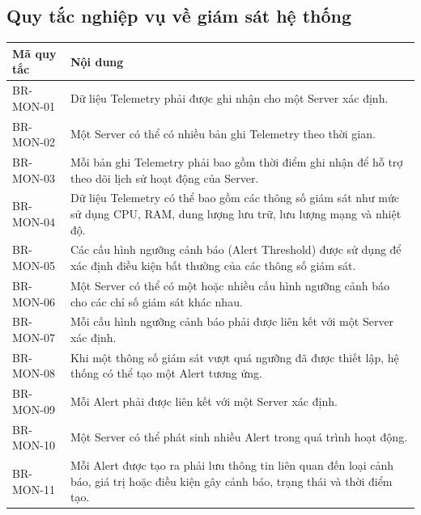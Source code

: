 \subsection{Quy tắc nghiệp vụ về giám sát hệ thống}
\begin{center}
\begin{longtable}{|>{\raggedright\arraybackslash}p{3.5cm}|>{\raggedright\arraybackslash}p{11.0cm}|}
\hline
\textbf{Mã quy tắc} & \textbf{Nội dung} \\ \hline
\endhead
BR-MON-01 & Dữ liệu Telemetry phải được ghi nhận cho một Server xác định. \\ \hline
BR-MON-02 & Một Server có thể có nhiều bản ghi Telemetry theo thời gian. \\ \hline
BR-MON-03 & Mỗi bản ghi Telemetry phải bao gồm thời điểm ghi nhận để hỗ trợ theo dõi lịch sử hoạt động của Server. \\ \hline
BR-MON-04 & Dữ liệu Telemetry có thể bao gồm các thông số giám sát như mức sử dụng CPU, RAM, dung lượng lưu trữ, lưu lượng mạng và nhiệt độ. \\ \hline
BR-MON-05 & Các cấu hình ngưỡng cảnh báo (Alert Threshold) được sử dụng để xác định điều kiện bất thường của các thông số giám sát. \\ \hline
BR-MON-06 & Một Server có thể có một hoặc nhiều cấu hình ngưỡng cảnh báo cho các chỉ số giám sát khác nhau. \\ \hline
BR-MON-07 & Mỗi cấu hình ngưỡng cảnh báo phải được liên kết với một Server xác định. \\ \hline
BR-MON-08 & Khi một thông số giám sát vượt quá ngưỡng đã được thiết lập, hệ thống có thể tạo một Alert tương ứng. \\ \hline
BR-MON-09 & Mỗi Alert phải được liên kết với một Server xác định. \\ \hline
BR-MON-10 & Một Server có thể phát sinh nhiều Alert trong quá trình hoạt động. \\ \hline
BR-MON-11 & Mỗi Alert được tạo ra phải lưu thông tin liên quan đến loại cảnh báo, giá trị hoặc điều kiện gây cảnh báo, trạng thái và thời điểm tạo. \\ \hline
\end{longtable}
\end{center}

